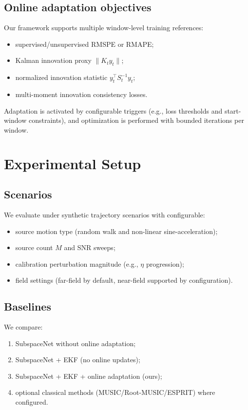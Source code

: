 \documentclass{article}
\begin{document}
\subsection{Online adaptation objectives}
Our framework supports multiple window-level training references:
\begin{itemize}[leftmargin=*,itemsep=2pt]
    \item supervised/unsupervised RMSPE or RMAPE;
    \item Kalman innovation proxy $\|K_t y_t\|$;
    \item normalized innovation statistic $y_t^\top S_t^{-1}y_t$;
    \item multi-moment innovation consistency losses.
\end{itemize}
Adaptation is activated by configurable triggers (e.g., loss thresholds and start-window constraints), and optimization is performed with bounded iterations per window.

\section{Experimental Setup}
\subsection{Scenarios}
We evaluate under synthetic trajectory scenarios with configurable:
\begin{itemize}[leftmargin=*,itemsep=2pt]
    \item source motion type (random walk and non-linear sine-acceleration);
    \item source count $M$ and SNR sweeps;
    \item calibration perturbation magnitude (e.g., $\eta$ progression);
    \item field settings (far-field by default, near-field supported by configuration).
\end{itemize}

\subsection{Baselines}
We compare:
\begin{enumerate}[leftmargin=*,itemsep=2pt]
    \item SubspaceNet without online adaptation;
    \item SubspaceNet + EKF (no online updates);
    \item SubspaceNet + EKF + online adaptation (ours);
    \item optional classical methods (MUSIC/Root-MUSIC/ESPRIT) where configured.
\end{enumerate}
\end{document}
